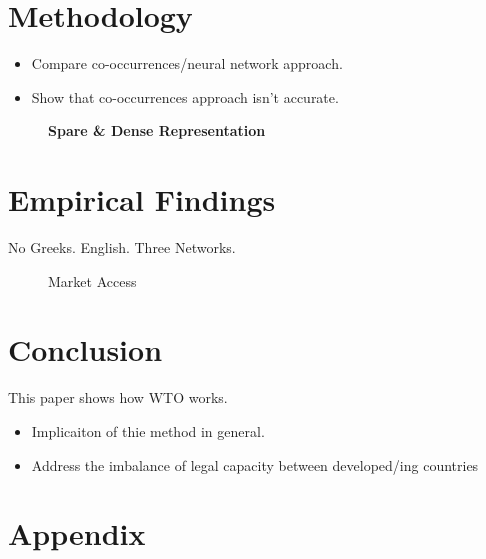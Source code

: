 \documentclass[12pt,letterpaper]{article}
\begin{document}
\section{Methodology}

\begin{itemize}
  \item Compare co-occurrences/neural network approach.

  \item Show that co-occurrences approach isn't accurate.
\end{itemize}

\begin{figure}[!tbp]
  \begin{subfigure}[b]{0.49\textwidth}
  \end{subfigure}
  \hfill
  \begin{subfigure}[b]{0.49\textwidth}
  \end{subfigure}
  \caption{{\bf Spare \& Dense Representation}}
  \label{sparse_dense}
\end{figure}


\section{Empirical Findings}
No Greeks. English. Three Networks.

\begin{figure}
  \centering{
    
  }
  \caption{Market Access}
  \label{fig:market-aceess}
\end{figure}




\section{Conclusion}
This paper shows how WTO works.

\begin{itemize}
  \item Implicaiton of thie method in general.
  \item Address the imbalance of legal capacity between developed/ing countries
\end{itemize}

\clearpage



\section{Appendix}


\end{document}
